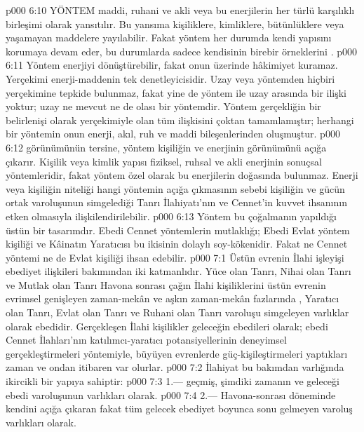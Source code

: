 \vs p000 6:10 YÖNTEM maddi, ruhani ve akli veya bu enerjilerin her türlü karşılıklı birleşimi olarak yansıtılır. Bu yansıma kişiliklere, kimliklere, bütünlüklere veya yaşamayan maddelere yayılabilir. Fakat yöntem her durumda kendi yapısını korumaya devam eder, bu durumlarda sadece kendisinin birebir örneklerini .
\vs p000 6:11 Yöntem enerjiyi dönüştürebilir, fakat onun üzerinde hâkimiyet kuramaz. Yerçekimi enerji\hyp{}maddenin tek denetleyicisidir. Uzay veya yöntemden hiçbiri yerçekimine tepkide bulunmaz, fakat yine de yöntem ile uzay arasında bir ilişki yoktur; uzay ne mevcut ne de olası bir yöntemdir. Yöntem gerçekliğin bir belirlenişi olarak yerçekimiyle olan tüm ilişkisini çoktan tamamlamıştır; herhangi bir yöntemin  onun enerji, akıl, ruh ve maddi bileşenlerinden oluşmuştur.
\vs p000 6:12  görünümünün tersine, yöntem kişiliğin ve enerjinin  görünümünü açığa çıkarır. Kişilik veya kimlik yapısı fiziksel, ruhsal ve akli enerjinin sonuçsal yöntemleridir, fakat yöntem özel olarak bu enerjilerin doğasında bulunmaz. Enerji veya kişiliğin niteliği hangi yöntemin açığa çıkmasının sebebi kişiliğin ve gücün ortak varoluşunun simgelediği Tanrı İlahiyatı’nın ve Cennet’in kuvvet ihsanının etken olmasıyla ilişkilendirilebilir.
\vs p000 6:13 Yöntem bu çoğalmanın yapıldığı üstün bir tasarımdır. Ebedi Cennet yöntemlerin mutlaklığı; Ebedi Evlat yöntem kişiliği ve Kâinatın Yaratıcısı bu ikisinin dolaylı soy\hyp{}kökenidir. Fakat ne Cennet yöntemi ne de Evlat kişiliği ihsan edebilir.
\vs p000 7:1 Üstün evrenin İlahi işleyişi ebediyet ilişkileri bakımından iki katmanlıdır. Yüce olan Tanrı, Nihai olan Tanrı ve Mutlak olan Tanrı Havona sonrası çağın İlahi kişiliklerini üstün evrenin evrimsel genişleyen zaman\hyp{}mekân ve aşkın zaman\hyp{}mekân fazlarında , Yaratıcı olan Tanrı, Evlat olan Tanrı ve Ruhani olan Tanrı varoluşu simgeleyen varlıklar olarak ebedidir. Gerçekleşen İlahi kişilikler geleceğin ebedileri olarak; ebedi Cennet İlahları’nın katılımcı\hyp{}yaratıcı potansiyellerinin deneyimsel gerçekleştirmeleri yöntemiyle, büyüyen evrenlerde güç\hyp{}kişileştirmeleri yaptıkları zaman ve ondan itibaren var olurlar.
\vs p000 7:2 İlahiyat bu bakımdan varlığında ikircikli bir yapıya sahiptir:
\vs p000 7:3 1.\bibnobreakspace {}--- geçmiş, şimdiki zamanın ve geleceği ebedi varoluşunun varlıkları olarak.
\vs p000 7:4 2.\bibnobreakspace {}--- Havona\hyp{}sonrası döneminde kendini açığa çıkaran fakat tüm gelecek ebediyet boyunca sonu gelmeyen varoluş varlıkları olarak.
